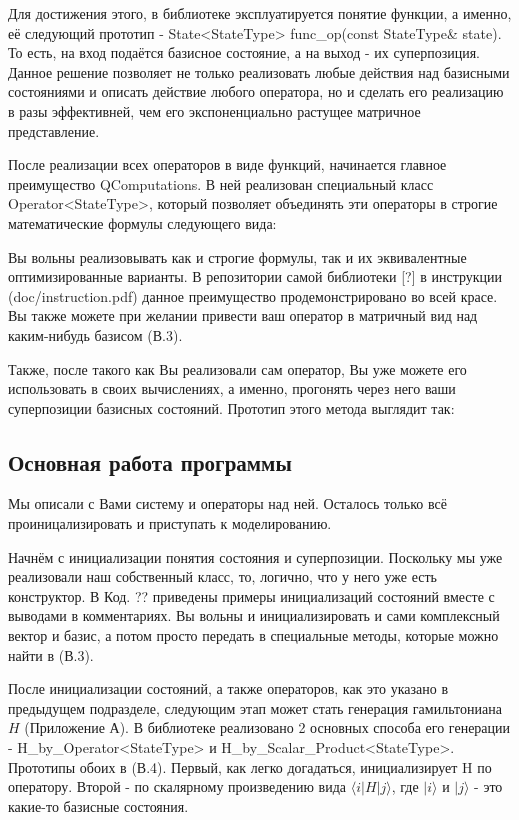 \documentclass[aps,twocolumn,pra,showpacs,amsmath,amssymb,showkeys,10pt]{revtex4-2}
\begin{document}
    Для достижения этого, в библиотеке эксплуатируется понятие функции, а именно, её следующий прототип - State<StateType> func\_op(const StateType\& state). То есть, на вход подаётся базисное состояние, 
    а на выход - их суперпозиция. Данное решение позволяет не только реализовать любые действия над базисными состояниями и описать действие любого оператора, но и сделать его реализацию в разы
    эффективней, чем его экспоненциально растущее матричное представление.

    После реализации всех операторов в виде функций, начинается главное преимущество QComputations. В ней реализован специальный класс Operator<StateType>, который позволяет объединять эти операторы 
    в строгие математические формулы следующего вида:


    Вы вольны реализовывать как и строгие формулы, так и их эквивалентные оптимизированные варианты. В репозитории самой библиотеки [?] в инструкции (doc/instruction.pdf) данное преимущество
    продемонстрировано во всей красе. Вы также можете при желании привести ваш оператор в матричный вид над каким-нибудь базисом (В.3). 

    Также, после такого как Вы реализовали сам оператор, Вы уже можете его использовать в своих вычислениях, а именно, прогонять через него ваши суперпозиции базисных состояний. Прототип этого метода 
    выглядит так:



    \subsection{Основная работа программы}

    Мы описали с Вами систему и операторы над ней. Осталось только всё проиницализировать и приступать к моделированию.

    Начнём с инициализации понятия состояния и суперпозиции. Поскольку мы уже реализовали наш собственный класс, то, логично, что у него уже есть конструктор. В Код. ?? приведены примеры 
    инициализаций состояний вместе с выводами в комментариях. Вы вольны и инициализировать и сами комплексный вектор и базис, а потом просто передать в специальные методы, которые можно найти в (В.3).

    После инициализации состояний, а также операторов, как это указано в предыдущем подразделе, следующим этап может стать генерация гамильтониана $H$ (Приложение А). В библиотеке реализовано 2 основных 
    способа его генерации - H\_by\_Operator<StateType> и H\_by\_Scalar\_Product<StateType>. Прототипы обоих в (В.4). Первый, как легко догадаться, инициализирует H по оператору. Второй - по скалярному 
    произведению вида $\langle i|H|j\rangle$, где $|i\rangle$ и $|j\rangle$ - это какие-то базисные состояния.
    
\end{document}
